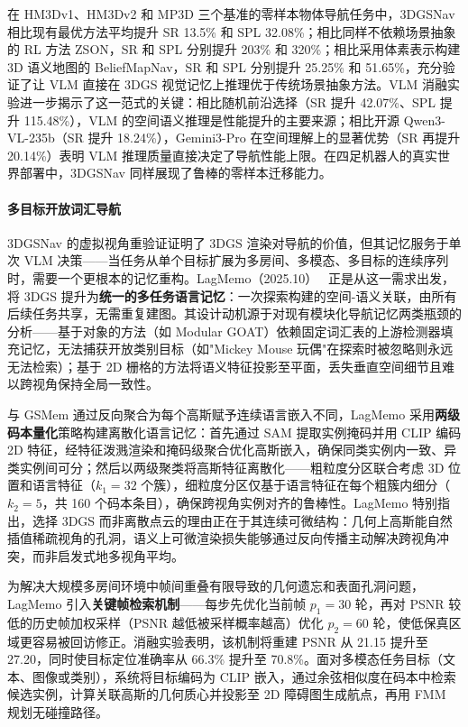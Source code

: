 在 HM3Dv1、HM3Dv2 和 MP3D 三个基准的零样本物体导航任务中，3DGSNav 相比现有最优方法平均提升 SR 13.5\% 和 SPL 32.08\%；相比同样不依赖场景抽象的 RL 方法 ZSON，SR 和 SPL 分别提升 203\% 和 320\%；相比采用体素表示构建 3D 语义地图的 BeliefMapNav，SR 和 SPL 分别提升 25.25\% 和 51.65\%，充分验证了让 VLM 直接在 3DGS 视觉记忆上推理优于传统场景抽象方法。VLM 消融实验进一步揭示了这一范式的关键：相比随机前沿选择（SR 提升 42.07\%、SPL 提升 115.48\%），VLM 的空间语义推理是性能提升的主要来源；相比开源 Qwen3-VL-235b（SR 提升 18.24\%），Gemini3-Pro 在空间理解上的显著优势（SR 再提升 20.14\%）表明 VLM 推理质量直接决定了导航性能上限。在四足机器人的真实世界部署中，3DGSNav 同样展现了鲁棒的零样本迁移能力。

\paragraph{多目标开放词汇导航}

3DGSNav 的虚拟视角重验证证明了 3DGS 渲染对导航的价值，但其记忆服务于单次 VLM 决策——当任务从单个目标扩展为多房间、多模态、多目标的连续序列时，需要一个更根本的记忆重构。LagMemo（2025.10）~\cite{2510_24118} 正是从这一需求出发，将 3DGS 提升为\textbf{统一的多任务语言记忆}：一次探索构建的空间-语义关联，由所有后续任务共享，无需重复建图。其设计动机源于对现有模块化导航记忆两类瓶颈的分析——基于对象的方法（如 Modular GOAT）依赖固定词汇表的上游检测器填充记忆，无法捕获开放类别目标（如"Mickey Mouse 玩偶"在探索时被忽略则永远无法检索）；基于 2D 栅格的方法将语义特征投影至平面，丢失垂直空间细节且难以跨视角保持全局一致性。

与 GSMem 通过反向聚合为每个高斯赋予连续语言嵌入不同，LagMemo 采用\textbf{两级码本量化}策略构建离散化语言记忆：首先通过 SAM 提取实例掩码并用 CLIP 编码 2D 特征，经特征泼溅渲染和掩码级聚合优化高斯嵌入，确保同类实例内一致、异类实例间可分；然后以两级聚类将高斯特征离散化——粗粒度分区联合考虑 3D 位置和语言特征（$k_1 = 32$ 个簇），细粒度分区仅基于语言特征在每个粗簇内细分（$k_2 = 5$，共 160 个码本条目），确保跨视角实例对齐的鲁棒性。LagMemo 特别指出，选择 3DGS 而非离散点云的理由正在于其连续可微结构：几何上高斯能自然插值稀疏视角的孔洞，语义上可微渲染损失能够通过反向传播主动解决跨视角冲突，而非启发式地多视角平均。

为解决大规模多房间环境中帧间重叠有限导致的几何遗忘和表面孔洞问题，LagMemo 引入\textbf{关键帧检索机制}——每步先优化当前帧 $p_1 = 30$ 轮，再对 PSNR 较低的历史帧加权采样（PSNR 越低被采样概率越高）优化 $p_2 = 60$ 轮，使低保真区域更容易被回访修正。消融实验表明，该机制将重建 PSNR 从 21.15 提升至 27.20，同时使目标定位准确率从 66.3\% 提升至 70.8\%。面对多模态任务目标（文本、图像或类别），系统将目标编码为 CLIP 嵌入，通过余弦相似度在码本中检索候选实例，计算关联高斯的几何质心并投影至 2D 障碍图生成航点，再用 FMM 规划无碰撞路径。

